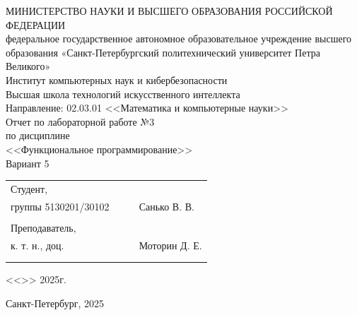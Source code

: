 \documentclass[a4paper, final]{article}
\begin{document}
	
	\begin{center}
		\hfill \break
		\hfill \break
		\normalsize{МИНИСТЕРСТВО НАУКИ И ВЫСШЕГО ОБРАЗОВАНИЯ РОССИЙСКОЙ ФЕДЕРАЦИИ\\
			федеральное государственное автономное образовательное учреждение высшего образования «Санкт-Петербургский политехнический университет Петра Великого»\\[10pt]}
		\normalsize{Институт компьютерных наук и кибербезопасности}\\[10pt] 
		\normalsize{Высшая школа технологий искусственного интеллекта}\\[10pt] 
		\normalsize{Направление: 02.03.01 <<Математика и компьютерные науки>>}\\
		
		\hfill \break
		\hfill \break
		\hfill \break
		\hfill \break
		\large{Отчет по лабораторной работе №3}\\
		\large{по дисциплине}\\
		\large{<<Функциональное программирование>>}\\
		\large{Вариант 5}\\
		\hfill \break
	\end{center}
	
	\small{ 
		\begin{tabular}{lrrl}
			\!\!\!Студент, & \hspace{2cm} & & \\
			\!\!\!группы 5130201/30102 & \hspace{2cm} & \underline{\hspace{3cm}} &Санько В. В. \\\\
			\!\!\!Преподаватель,\\ \hspace{-5pt}к. т. н., доц. & \hspace{2cm} &  \underline{\hspace{3cm}} &  Моторин Д. Е. \\\\
			&&\hspace{4cm}
		\end{tabular}
		\begin{flushright}
			<<\underline{\hspace{1cm}}>>\underline{\hspace{2.5cm}} 2025г.
		\end{flushright}
	}
	
	\hfill \break
	\vspace{3cm}
	\begin{center} \small{Санкт-Петербург, 2025} \end{center}
	\thispagestyle{empty}
	
\end{document}
